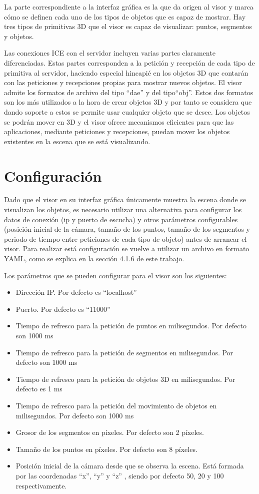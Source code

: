 La parte correspondiente a la interfaz gráfica es la que da origen al visor y marca cómo se definen cada uno de los tipos de objetos que es capaz de mostrar. Hay tres tipos de primitivas 3D que el visor es capaz de visualizar: puntos, segmentos y objetos.

Las conexiones ICE con el servidor incluyen varias partes claramente diferenciadas. Estas partes corresponden a la petición y recepción de cada tipo de primitiva al servidor, haciendo especial hincapié en los objetos 3D que contarán con las peticiones y recepciones propias para mostrar nuevos objetos. El visor admite los formatos de archivo del tipo ``dae'' y del tipo``obj''. Estos dos formatos son los más utilizados a la hora de crear objetos 3D y por tanto se considera que dando soporte a estos se permite usar cualquier objeto que se desee. Los objetos se podrán mover en 3D y el visor ofrece mecanismos eficientes para que las aplicaciones, mediante  peticiones y recepciones, puedan mover los objetos existentes en la escena que se está visualizando.

\section{Configuración}
Dado que el visor en su interfaz gráfica únicamente muestra la escena donde se visualizan los objetos, es necesario utilizar una alternativa para configurar los datos de conexión (ip y puerto de escucha) y otros parámetros configurables (posición inicial de la cámara, tamaño de los puntos, tamaño de los segmentos y periodo de tiempo entre peticiones de cada tipo de objeto) antes de arrancar el visor. Para realizar está configuración se vuelve a utilizar un archivo en formato YAML, como se explica en la sección 4.1.6 de este trabajo.

Los parámetros que se pueden configurar para el visor son los siguientes:
\begin{itemize}
\item Dirección IP. Por defecto es ``localhost''
\item Puerto. Por defecto es ``11000''
\item Tiempo de refresco para la petición de puntos en milisegundos. Por defecto son 1000 ms
\item Tiempo de refresco para la petición de segmentos en milisegundos. Por defecto son 1000 ms
\item Tiempo de refresco para la petición de objetos 3D en milisegundos. Por defecto es 1 ms
\item Tiempo de refresco para la petición del movimiento de objetos en milisegundos. Por defecto son 1000 ms
\item Grosor de los segmentos en píxeles. Por defecto son 2 píxeles.
\item Tamaño de los puntos en píxeles. Por defecto son 8 píxeles.
\item Posición inicial de la cámara desde que se observa la escena. Está formada por las coordenadas ``x'', ``y'' y ``z'' , siendo por defecto 50, 20 y 100 respectivamente.
\end{itemize}

